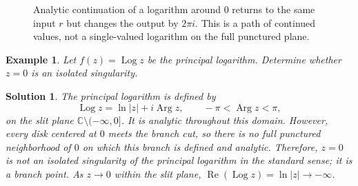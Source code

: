 \documentclass{report}
\newtheorem{example}{Example}
\newtheorem{solution}{Solution}
\begin{document}
\begin{figure}[H]
    \centering
    \caption{Analytic continuation of a logarithm around $0$ returns to the same input $r$ but changes the output by $2\pi i$. This is a path of continued values, not a single-valued logarithm on the full punctured plane.}
    \label{fig:log-monodromy}
\end{figure}


\begin{example}
    Let $f(z)=\operatorname{Log}z$ be the principal logarithm. Determine
    whether $z=0$ is an isolated singularity.
\end{example}
\begin{solution}
    The principal logarithm is defined by
    \[
        \operatorname{Log}z=\ln|z|+i\operatorname{Arg}z,
        \qquad -\pi<\operatorname{Arg}z<\pi,
    \]
    on the slit plane $\mathbb{C}\setminus(-\infty,0]$. It is analytic
    throughout this domain. However, every disk centered at $0$ meets the
    branch cut, so there is no full punctured neighborhood of $0$ on which
    this branch is defined and analytic. Therefore, $z=0$ is not an isolated
    singularity of the principal logarithm in the standard sense; it is a
    branch point. As $z\to0$ within the slit plane,
    $\operatorname{Re}(\operatorname{Log}z)=\ln|z|\to-\infty$.
\end{solution}
\end{document}
